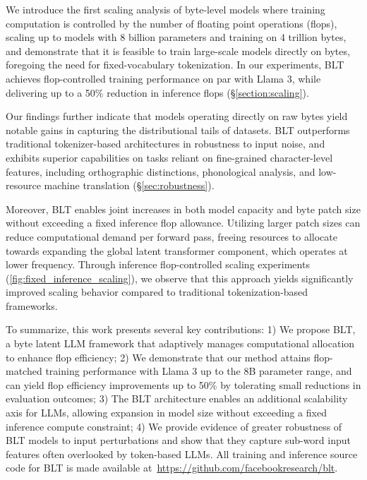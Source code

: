 We introduce the first scaling analysis of byte-level models where training computation is controlled by the number of floating point operations (flops), scaling up to models with 8 billion parameters and training on 4 trillion bytes, and demonstrate that it is feasible to train large-scale models directly on bytes, foregoing the need for fixed-vocabulary tokenization. In our experiments, {\textsc BLT} achieves flop-controlled training performance on par with Llama 3, while delivering up to a 50\% reduction in inference flops (\S\ref{section:scaling}).

Our findings further indicate that models operating directly on raw bytes yield notable gains in capturing the distributional tails of datasets. {\textsc BLT} outperforms traditional tokenizer-based architectures in robustness to input noise, and exhibits superior capabilities on tasks reliant on fine-grained character-level features, including orthographic distinctions, phonological analysis, and low-resource machine translation (\S\ref{sec:robustness}).

Moreover, {\textsc BLT} enables joint increases in both model capacity and byte patch size without exceeding a fixed inference flop allowance. Utilizing larger patch sizes can reduce computational demand per forward pass, freeing resources to allocate towards expanding the global latent transformer component, which operates at lower frequency. Through inference flop-controlled scaling experiments (\autoref{fig:fixed_inference_scaling}), we observe that this approach yields significantly improved scaling behavior compared to traditional tokenization-based frameworks.

To summarize, this work presents several key contributions: 1) We propose {\textsc BLT}, a byte latent LLM framework that adaptively manages computational allocation to enhance flop efficiency; 2) We demonstrate that our method attains flop-matched training performance with Llama 3 up to the 8B parameter range, and can yield flop efficiency improvements up to 50\% by tolerating small reductions in evaluation outcomes; 3) The {\textsc BLT} architecture enables an additional scalability axis for LLMs, allowing expansion in model size without exceeding a fixed inference compute constraint; 4) We provide evidence of greater robustness of {\textsc BLT} models to input perturbations and show that they capture sub-word input features often overlooked by token-based LLMs. All training and inference source code for {\textsc BLT} is made available at~\url{https://github.com/facebookresearch/blt}.

